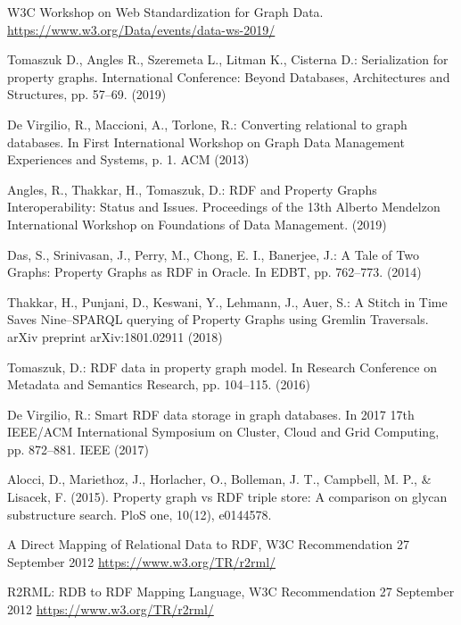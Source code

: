 \documentclass[runningheads]{llncs}
\begin{document}
\begin{thebibliography}{8}
W3C Workshop on Web Standardization for Graph Data. \url{https://www.w3.org/Data/events/data-ws-2019/}

Tomaszuk D., Angles R., Szeremeta L., Litman K., Cisterna D.:
Serialization for property graphs. International Conference: Beyond Databases, Architectures and Structures, pp. 57--69. (2019)

De Virgilio, R., Maccioni, A., Torlone, R.: Converting relational to graph databases. In First International Workshop on Graph Data Management Experiences and Systems, p. 1. ACM (2013)

Angles, R., Thakkar, H., Tomaszuk, D.: RDF and Property Graphs Interoperability: Status and Issues. Proceedings of the 13th Alberto Mendelzon International Workshop on Foundations of Data Management. (2019)

Das, S., Srinivasan, J., Perry, M., Chong, E. I., Banerjee, J.: A Tale of Two Graphs: Property Graphs as RDF in Oracle. In EDBT, pp. 762--773. (2014)

Thakkar, H., Punjani, D., Keswani, Y., Lehmann, J., Auer, S.: A Stitch in Time Saves Nine--SPARQL querying of Property Graphs using Gremlin Traversals. arXiv preprint arXiv:1801.02911 (2018)

Tomaszuk, D.: RDF data in property graph model. In Research Conference on Metadata and Semantics Research, pp. 104--115. (2016)

De Virgilio, R.: Smart RDF data storage in graph databases. In 2017 17th IEEE/ACM International Symposium on Cluster, Cloud and Grid Computing, pp. 872--881. IEEE (2017)

Alocci, D., Mariethoz, J., Horlacher, O., Bolleman, J. T., Campbell, M. P., & Lisacek, F. (2015). Property graph vs RDF triple store: A comparison on glycan substructure search. PloS one, 10(12), e0144578.

A Direct Mapping of Relational Data to RDF, W3C Recommendation 27 September 2012 \url{https://www.w3.org/TR/r2rml/}

R2RML: RDB to RDF Mapping Language, W3C Recommendation 27 September 2012 \url{https://www.w3.org/TR/r2rml/}





\end{thebibliography}
\end{document}
